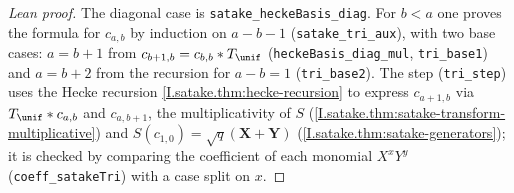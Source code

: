 \begin{proof}[Lean proof]
The diagonal case is \texttt{satake\_heckeBasis\_diag}. For $b<a$ one proves the formula for $c_{a,b}$ by induction on $a-b-1$ (\texttt{satake\_tri\_aux}), with two base cases: $a=b+1$ from $c_{b+1,b}=c_{b,b}*T_\unif$ (\texttt{heckeBasis\_diag\_mul}, \texttt{tri\_base1}) and $a=b+2$ from the recursion for $a-b=1$ (\texttt{tri\_base2}). The step (\texttt{tri\_step}) uses the Hecke recursion \cref{I.satake.thm:hecke-recursion} to express $c_{a+1,b}$ via $T_\unif*c_{a,b}$ and $c_{a,b+1}$, the multiplicativity of $S$ (\cref{I.satake.thm:satake-transform-multiplicative}) and $S(c_{1,0})=\sqrt q(\mathbf X+\mathbf Y)$ (\cref{I.satake.thm:satake-generators}); it is checked by comparing the coefficient of each monomial $X^xY^y$ (\texttt{coeff\_satakeTri}) with a case split on $x$.
\end{proof}

